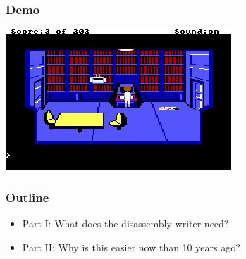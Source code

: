 \documentclass{beamer}
\begin{document}
\begin{frame}
  \frametitle{Demo}

  \includegraphics[width=\linewidth]{sq_keypad}
\end{frame}

\begin{frame}
  \frametitle{Outline}
    \begin{itemize}
      \item Part I: What does the disassembly writer need?
      \item Part II: Why is this easier now than 10 years ago?
    \end{itemize}
\end{frame}
\end{document}
